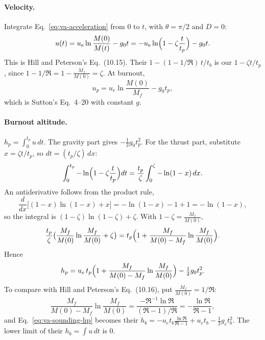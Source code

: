 \paragraph{Velocity.} Integrate Eq.~\ref{eq:va-acceleration} from $0$ to
$t$, with $\theta=\pi/2$ and $D=0$:
\begin{equation}\label{eq:va-sounding-u}
 u(t)=u_e\ln\frac{M(0)}{M(t)}-g_0t
     =-u_e\ln\Bigl(1-\zeta\frac{t}{t_p}\Bigr)-g_0t .
\end{equation}
This is Hill and Peterson's Eq.~(10.15). Their
$1-(1-1/\mathfrak R)\,t/t_b$ is our $1-\zeta t/t_p$, since
$1-1/\mathfrak R=1-\frac{M_f}{M(0)}=\zeta$. At burnout,
\begin{equation}\label{eq:va-sounding-up}
 u_p=u_e\ln\frac{M(0)}{M_f}-g_0t_p ,
\end{equation}
which is Sutton's Eq.~4--20 with constant $g$.

\paragraph{Burnout altitude.} $h_p=\int_0^{t_p}u\,dt$. The gravity part
gives $-\tfrac12g_0t_p^2$. For the thrust part, substitute
$x=\zeta t/t_p$, so $dt=(t_p/\zeta)\,dx$:
\[
 \int_0^{t_p}-\ln\Bigl(1-\zeta\frac{t}{t_p}\Bigr)dt
 =\frac{t_p}{\zeta}\int_0^{\zeta}-\ln(1-x)\,dx .
\]
An antiderivative follows from the product rule,
\[
 \frac{d}{dx}\bigl[(1-x)\ln(1-x)+x\bigr]
 =-\ln(1-x)-1+1=-\ln(1-x),
\]
so the integral is $(1-\zeta)\ln(1-\zeta)+\zeta$. With $1-\zeta=\frac{M_f}{M(0)}$,
\[
 \frac{t_p}{\zeta}\bigl(\frac{M_f}{M(0)}\ln \frac{M_f}{M(0)}+\zeta\bigr)
 =t_p\Bigl(1+\frac{M_f}{M(0)-M_f}\ln\frac{M_f}{M(0)}\Bigr).
\]
Hence
\begin{equation}\label{eq:va-sounding-hp}
 h_p=u_e\,t_p\Bigl(1+\frac{M_f}{M(0)-M_f}\ln\frac{M_f}{M(0)}\Bigr)
     -\tfrac12g_0t_p^2 .
\end{equation}
To compare with Hill and Peterson's Eq.~(10.16), put
$\frac{M_f}{M(0)}=1/\mathfrak R$:
\[
 \frac{M_f}{M(0)-M_f}\ln\frac{M_f}{M(0)}
 =\frac{-\mathfrak R^{-1}\ln\mathfrak R}{(\mathfrak R-1)/\mathfrak R}
 =-\frac{\ln\mathfrak R}{\mathfrak R-1},
\]
and Eq.~\ref{eq:va-sounding-hp} becomes their
$h_b=-u_et_b\frac{\ln\mathfrak R}{\mathfrak R-1}+u_et_b-\tfrac12g_et_b^2$.
The lower limit of their $h_b=\int u\,dt$ is $0$.

